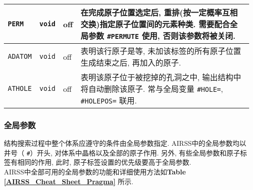 \documentclass[a4paper, 10pt]{article}
\begin{document}
\begin{center}
\begin{longtable}{m{10em}|m{4em}<{\centering}|m{3em}<{\centering}|m{15em}}
\midrule
 \verb|PERM| & \verb|void| & off & 在完成原子位置选定后, 重排(按一定概率互相交换)指定原子位置间的元素种类. 需要配合全局参数 \verb|#PERMUTE| 使用, 否则该参数将被关闭.\\
\midrule
 \verb|ADATOM| & \verb|void| & off & 表明该行原子是等, 未加该标签的所有原子位置生成结束之后, 再加入的原子.\\
\midrule
 \verb|ATHOLE| & \verb|void| & off & 表明该原子位于被挖掉的孔洞之中, 输出结构中将自动删除该原子. 常与全局变量 \verb|#HOLE=|, \verb|#HOLEPOS=| 联用.\\
\bottomrule
\end{longtable}
\end{center}

\subsubsection{全局参数}

结构搜索过程中整个体系应遵守的条件由全局参数指定.  AIRSS中的全局参数均以井号（ \verb|#|）开头, 对体系中晶格以及全部的原子作用. 另外, 有些全局参数和原子标签有相同的作用, 此时, 原子标签设置的优先级要高于全局参数.\\

AIRSS中全部可用的全局参数的功能和详细使用方法如\textbf{Table \ref{AIRSS_Cheat_Sheet_Pragma}} 所示.
\end{document}
